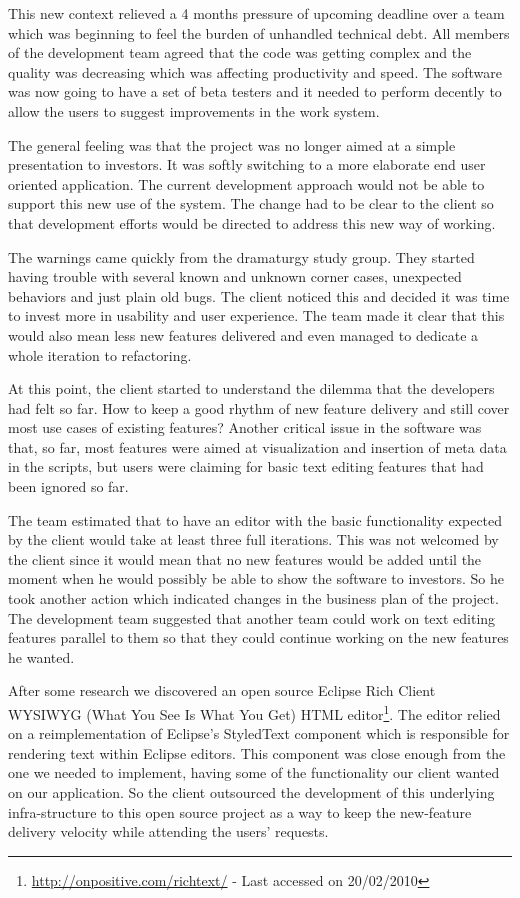 \documentclass[lnbip]{svmultln}
\begin{document}
This new context relieved a 4 months pressure of upcoming deadline
over a team which was beginning to feel the burden of unhandled
technical debt. All members of the development team agreed that the
code was getting complex and the quality was decreasing which was
affecting productivity and speed. The software was now going to have a
set of beta testers and it needed to perform decently to allow the
users to suggest improvements in the work system.

The general feeling was that the project was no longer aimed at a
simple presentation to investors. It was softly switching to a more
elaborate end user oriented application. The current development
approach would not be able to support this new use of the system. The
change had to be clear to the client so that development efforts would
be directed to address this new way of working.

The warnings came quickly from the dramaturgy study group. They
started having trouble with several known and unknown corner cases,
unexpected behaviors and just plain old bugs. The client noticed this
 and decided it was time to invest more in usability and user experience. The
 team made it clear that this would also mean less new features delivered and even managed to dedicate a whole iteration to refactoring.

At this point, the client started to understand the dilemma that the
developers had felt so far. How to keep a good rhythm of new feature delivery
and still cover most use cases of existing features? Another critical
issue in the software was that, so far, most features were aimed at
visualization and insertion of meta data in the scripts, but users
were claiming for basic text editing features that had been ignored so far.

The team estimated that to have an editor with the basic functionality
expected by the client would take at least three full iterations. This
was not welcomed by the client since it would mean that no new
features would be added until the moment when he would possibly be able to show the
software to investors. So he took another action which indicated
changes in the business plan of the project. The development team suggested that another team could work on text editing features parallel to them so that they could continue working on the new features he wanted.

After some research we discovered an open source
Eclipse Rich Client WYSIWYG (What You See Is What You Get) HTML
editor\footnote{\url{http://onpositive.com/richtext/} - Last accessed on
20/02/2010}. The editor relied on a reimplementation of Eclipse's
StyledText component which is responsible for rendering text within
Eclipse editors. This component was close enough from the one we
needed to implement, having some of the functionality our client wanted on our
application. So the client outsourced the development of this
underlying infra-structure to this open source project as a way to keep the new-feature delivery
velocity while attending the users' requests.
\end{document}
